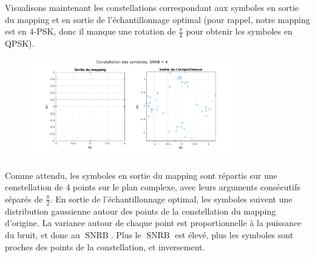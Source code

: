 \documentclass[a4paper, 12pt]{article}
\begin{document}
Visualisons maintenant les constellations correspondant aux symboles en sortie
du mapping et en sortie de l'échantillonnage optimal (pour rappel, notre mapping
est en 4-PSK, donc il manque une rotation de $\frac{\pi}{4}$ pour obtenir les
symboles en QPSK).

\begin{figure}[H]
    \centering
    \includegraphics[trim=70 0 70 0, clip, width=0.8\textwidth]{graphics/2-4_4.png}
    \label{fig:constellation_dvbs}
\end{figure}

\vspace*{-1cm}
\begin{figure}[H]
\begin{adjustbox}{center}
\end{adjustbox}
\end{figure}

Comme attendu, les symboles en sortie du mapping sont répartis sur une
constellation de 4 points sur le plan complexe, avec leurs arguments consécutifs
séparés de $\frac{\pi}{2}$. En sortie de l'échantillonnage optimal, les symboles
suivent une distribution gaussienne autour des points de la constellation du
mapping d'origine. La variance autour de chaque point est proportionnelle à la
puissance du bruit, et donc au $\operatorname{SNRB}$. Plus le $\operatorname{SNRB}$
est élevé, plus les symboles sont proches des points de la constellation, et
inversement. \medbreak
\end{document}
